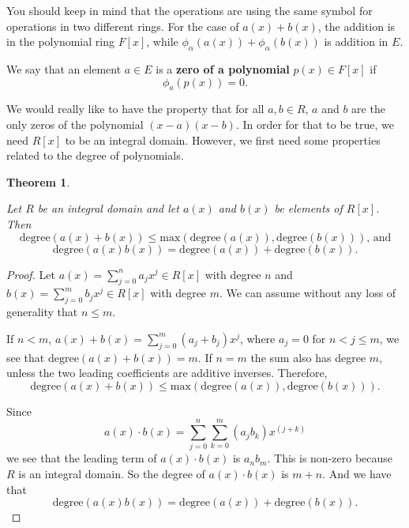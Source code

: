 \documentclass[
]{book}
\newtheorem{theorem}{Theorem}[chapter]
\theoremstyle{definition}
\theoremstyle{definition}
\theoremstyle{definition}
\theoremstyle{definition}
\theoremstyle{remark}
\begin{document}
You should keep in mind that the operations are using the same symbol for operations in two different rings. For the case of \(a(x)+b(x)\), the addition is in the polynomial ring \(F[x]\), while \(\phi_\alpha \left(a(x)\right) + \phi_\alpha \left(b(x)\right)\) is addition in \(E\).

We say that an element \(a \in E\) is a \textbf{zero of a polynomial} \(p(x)\in F[x]\) if \[\phi_a ( p(x))=0.\]

We would really like to have the property that for all \(a,b \in R\), \(a\) and \(b\) are the only zeros of the polynomial \((x-a)(x-b)\).
In order for that to be true, we need \(R[x]\) to be an integral domain. However, we first need some properties related to the degree of polynomials.

\begin{theorem}
\protect\hypertarget{thm:unlabeled-div-116}{}\label{thm:unlabeled-div-116}

Let \(R\) be an integral domain and let \(a(x)\) and \(b(x)\) be elements of \(R[x]\). Then
\[\mathrm{degree}(a(x)+b(x))\leq \mathrm{max}\left( \mathrm{degree}(a(x)), \mathrm{degree}(b(x))\right) \mbox{, and}\]
\[\mathrm{degree}\left( a(x) b(x)\right) = \mathrm{degree}(a(x))+\mathrm{degree}(b(x)).\]

\end{theorem}

\begin{proof}

Let \(a(x)=\sum_{j=0}^n a_j x^j \in R[x]\) with degree \(n\) and \(b(x)=\sum_{j=0}^m b_j x^j\in R[x]\) with degree \(m\). We can assume without any loss of generality that \(n\leq m\).

If \(n<m\), \(a(x)+b(x) = \sum_{j=0}^m (a_j+b_j) x^j\), where \(a_j=0\) for \(n<j\leq m\), we see that \(\mathrm{degree} (a(x)+b(x)) =m\). If \(n=m\) the sum also has degree \(m\), unless the two leading coefficients are additive inverses. Therefore, \[\mathrm{degree}(a(x)+b(x))\leq \mathrm{max}\left( \mathrm{degree}(a(x)), \mathrm{degree}(b(x))\right).\]

Since
\[a(x) \cdot b(x)  = \sum_{j=0}^n \sum_{k=0}^m \left(a_j b_k\right) x^{(j+k)}\] we see that the leading term of \(a(x)\cdot b(x)\) is \(a_n b_m\). This is non-zero because \(R\) is an integral domain. So the degree of \(a(x) \cdot b(x)\) is \(m+n\). And we have that \[\mathrm{degree}\left( a(x) b(x)\right) = \mathrm{degree}(a(x))+\mathrm{degree}(b(x)).\]

\end{proof}
\end{document}
